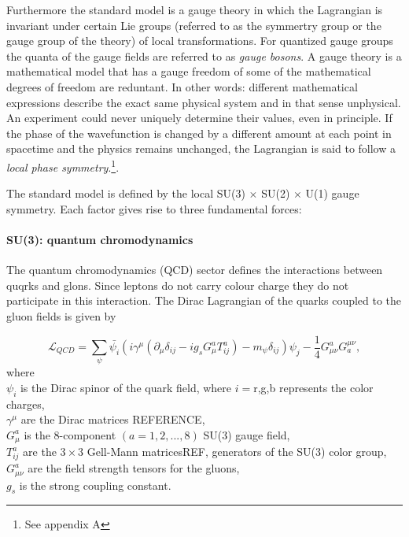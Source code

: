 Furthermore the standard model is a gauge theory in which the Lagrangian is invariant under certain Lie groups (referred to as the symmertry group or the gauge group of the theory) of local transformations. For quantized gauge groups the quanta of the gauge fields are referred to as \textit{gauge bosons}. A gauge theory is a mathematical model that has a gauge freedom of some of the mathematical degrees of freedom are reduntant. In other words: different mathematical expressions describe the exact same physical system and in that sense unphysical. An experiment could never uniquely determine their values, even in principle. If the phase of the wavefunction is changed by a different amount at each point in spacetime and the physics remains unchanged, the Lagrangian is said to follow a \textit{local phase symmetry}.\footnote{See appendix A}.

The standard model is defined by the local SU(3) $\times$ SU(2) $\times$ U(1) gauge symmetry. Each factor gives rise to three fundamental forces:
\paragraph{SU(3): quantum chromodynamics}
The quantum chromodynamics (QCD) sector defines the interactions between quqrks and glons. Since leptons do not carry colour charge they do not participate in this interaction. The Dirac Lagrangian of the quarks coupled to the gluon fields is given by

\begin{equation}
\mathcal{L}_{QCD} = \sum_{\psi} \bar{\psi_i} \left(i \gamma^\mu \left(\partial_\mu  \delta_{ij} - i g_s G^a_{\mu} T^a_{ij}\right) - m_\psi \delta_{ij} \right) \psi_j - \frac{1}{4} G^a_{\mu\nu}G^{\mu\nu}_a,
\end{equation}
where\\
\indent $\psi_i$ is the Dirac spinor of the quark field, where $i=${r,g,b} represents the color charges,\\
\indent $\gamma^\mu$ are the Dirac matrices REFERENCE,\\
\indent $G^a_\mu$ is the 8-component $\left(a=1,2,...,8\right)$ SU(3) gauge field,\\
\indent $T^a_{ij}$ are the $3\times3$ Gell-Mann matricesREF, generators of the SU(3) color group,\\
\indent $G^a_{\mu\nu}$ are the field strength tensors for the gluons,\\
\indent $g_s$ is the strong coupling constant.

